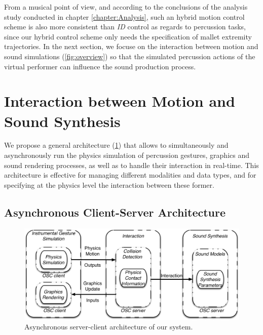 From a musical point of view, and according to the conclusions of the analysis study conducted in chapter \ref{chapter:Analysis}, such an hybrid motion control scheme is also more consistent than \emph{ID} control as regards to percussion tasks, since our hybrid control scheme only needs the specification of mallet extremity trajectories. In the next section, we focuse on the interaction between motion and sound simulations (\myfigname \ref{fig:overview}) so that the simulated percussion actions of the virtual performer can influence the sound production process.




	\section{Interaction between Motion and Sound Synthesis}
	\label{sec:Synthesis_Control}

We propose a general architecture (\myfigname \ref{fig:interaction}) that allows to simultaneously and asynchronously run the physics simulation of percussion gestures, graphics and sound rendering processes, as well as to handle their interaction in real-time. This architecture is effective for managing different modalities and data types, and for specifying at the physics level the interaction between these former.

	\subsection{Asynchronous Client-Server Architecture}
	\label{subsec:Synthesis_Control_InteractionArchitecture}

\begin{figure}
	\centering
	\includegraphics[width=\linewidth]{Chapters/5/Pics/Pdf/interaction2.pdf}
	\caption[Asynchronous server-client architecture of our system]{Asynchronous server-client architecture of our system.}
	\label{fig:interaction}
\end{figure}

